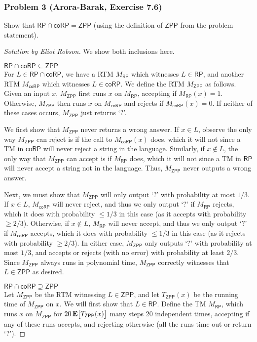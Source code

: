 \documentclass{article}
\newenvironment{solution}[1]{\begin{proof}[Solution by #1]}{\end{proof}}
\newcommand{\ZPP}{\mathsf{ZPP}}
\newcommand{\RP}{\mathsf{RP}}
\newcommand{\coRP}{\mathsf{coRP}}
\begin{document}
\subsubsection{Problem 3 (Arora-Barak, Exercise 7.6)}
Show that \(\RP \cap \coRP = \ZPP\) (using the definition of \(\ZPP\) from the problem statement).

\begin{solution}{Eliot Robson}
    We show both inclusions here.
    
    \(\RP \cap \coRP \subseteq \ZPP\)\\
    For \(L \in \RP \cap \coRP\), we have a RTM \(M_{\RP}\) which witnesses \(L \in \RP\), and another RTM \(M_{\coRP}\) which witnesses \(L \in \coRP\). We define the RTM \(M_{\ZPP}\) as follows. Given an input \(x\), \(M_{\ZPP}\) first runs \(x\) on \(M_{\RP}\), accepting if \(M_{\RP}(x) = 1\). Otherwise, \(M_{\ZPP}\) then runs \(x\) on \(M_{\coRP}\) and rejects if \(M_{\coRP}(x) = 0\). If neither of these cases occurs, \(M_{\ZPP}\) just returns `\(?\)'.
    
    We first show that \(M_{\ZPP}\) never returns a wrong answer. If \(x \in L\), observe the only way \(M_{\ZPP}\) can reject is if the call to \(M_{\coRP}(x)\) does, which it will not since a TM in \(\coRP\) will never reject a string in the language. Similarly, if \(x \notin L\), the only way that \(M_{\ZPP}\) can accept is if \(M_{\RP}\) does, which it will not since a TM in \(\RP\) will never accept a string not in the language. Thus, \(M_{\ZPP}\) never outputs a wrong answer.
    
    Next, we must show that \(M_{\ZPP}\) will only output `\(?\)' with probability at most \(1/3\). If \(x \in L\), \(M_{\coRP}\) will never reject, and thus we only output `\(?\)' if \(M_{\RP}\) rejects, which it does with probability \(\leq 1/3\) in this case (as it accepts with probability \(\geq 2/3\)). Otherwise, if \(x \notin L\), \(M_{\RP}\) will never accept, and thus we only output `\(?\)' if \(M_{\coRP}\) accepts, which it does with probability \(\leq 1/3\) in this case (as it rejects with probability \(\geq 2/3\)). In either case, \(M_{\ZPP}\) only outputs `\(?\)' with probability at most \(1/3\), and accepts or rejects (with no error) with probability at least \(2/3\). Since \(M_{\ZPP}\) always runs in polynomial time, \(M_{\ZPP}\) correctly witnesses that \(L \in \ZPP\) as desired.
    
    \(\RP \cap \coRP \supseteq \ZPP\)\\
    Let \(M_{\ZPP}\) be the RTM witnessing \(L \in \ZPP\), and let \(T_{\ZPP}(x)\) be the running time of \(M_{\ZPP}\) on \(x\). We will first show that \(L \in \RP\). Define the TM \(M_{\RP}\), which runs \(x\) on \(M_{\ZPP}\) for \(20 \Exp{T_{\ZPP}(x)}\) many steps 20 independent times, accepting if any of these runs accepts, and rejecting otherwise (all the runs time out or return `?').
    

\end{solution}
\end{document}
